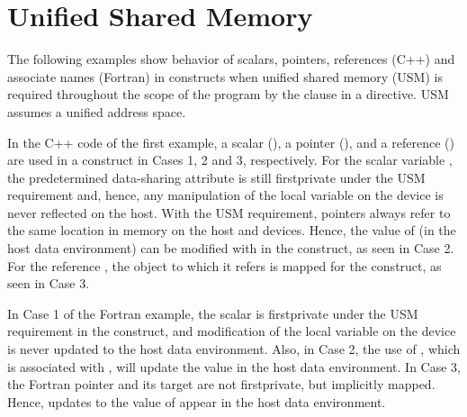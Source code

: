 \pagebreak
\section{Unified Shared Memory}
\label{sec:usm}



The following examples show behavior of scalars, pointers, references (C++) and 
associate names (Fortran) in  constructs when
unified shared memory (USM) is required throughout the scope of the program by the 
 clause in a  directive.
USM assumes a unified address space.

In the C++ code of the first example, a scalar (), a pointer 
(), and a reference () are used in a  construct in Cases 1, 2 and 3, respectively.
For the scalar variable , the predetermined data-sharing attribute is still
firstprivate under the USM requirement and, hence, any manipulation of the local variable on the device is never reflected on the host.
With the USM requirement, pointers always refer to the same location in memory on the host and devices.
Hence, the value of  (in the host data environment) can be modified with  in 
the  construct, as seen in Case 2. 
For the reference , the object to which it refers is mapped for  
the  construct, as seen in Case 3. 

In Case 1 of the Fortran example, the scalar  is firstprivate under the USM requirement
in the  construct, and modification of the local variable on the device is 
never updated to the host data environment.
Also, in Case 2, the use of , which is associated with , 
will update the  value in the host data environment.
In Case 3, the Fortran pointer  and its target  are not firstprivate, 
but implicitly mapped.  Hence, updates to the value of  appear in the host data environment.


{}
